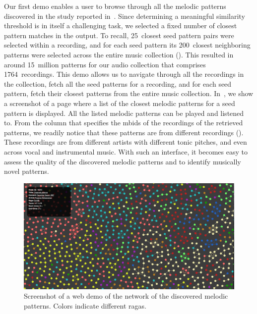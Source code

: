 Our first demo enables a user to browse through all the melodic patterns discovered in the study reported in~. Since determining a meaningful similarity threshold is in itself a challenging task, we selected a fixed number of closest pattern matches in the output. To recall, 25~closest seed pattern pairs were selected within a recording, and for each seed pattern its 200~closest neighboring patterns were selected across the entire music collection (). This resulted in around 15~million patterns for our audio collection that comprises 1764~recordings. This demo allows us to navigate through all the recordings in the collection, fetch all the seed patterns for a recording, and for each seed pattern, fetch their closest patterns from the entire music collection. In~, we show a screenshot of a page where a list of the closest melodic patterns for a seed pattern is displayed. All the listed melodic patterns can be played and listened to. From the column that specifies the \glspl{mbid} of the recordings of the retrieved patterns, we readily notice that these patterns are from different recordings (). These recordings are from different artists with different tonic pitches, and even across vocal and instrumental music. With such an interface, it becomes easy to assess the quality of the discovered melodic patterns and to identify musically novel patterns. 

\begin{figure}
	\begin{center}
		\includegraphics[width=\figSizeHundred]{ch08_applications/figures/patternNetwork1.png}
	\end{center}
	\caption[A web demo of a network of the discovered melodic patterns]{Screenshot of a web demo of the network of the discovered melodic patterns. Colors indicate different \glspl{raga}.}
	\label{fig:network_patterns}
\end{figure}

